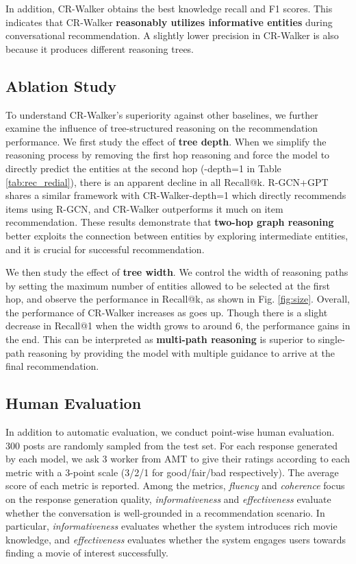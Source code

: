\documentclass[11pt]{article}
\begin{document}
In addition, CR-Walker obtains the best knowledge recall and F1 scores. This indicates that CR-Walker \textbf{reasonably utilizes informative entities} during conversational recommendation. A slightly lower precision in CR-Walker is also because it produces different reasoning trees. 



\subsection{Ablation Study}

To understand CR-Walker's superiority against other baselines, we further examine the influence of tree-structured reasoning on the recommendation performance. We first study the effect of \textbf{tree depth}. When we simplify the reasoning process by removing the first hop reasoning and force the model to directly predict the entities at the second hop (-depth=1 in Table \ref{tab:rec_redial}), there is an apparent decline in all Recall@k. R-GCN+GPT shares a similar framework with CR-Walker-depth=1 which directly recommends items using R-GCN, and CR-Walker outperforms it much on item recommendation. These results demonstrate that \textbf{two-hop graph reasoning} better exploits the connection between entities by exploring intermediate entities, and it is crucial for successful recommendation. 

We then study the effect of \textbf{tree width}. We control the width of reasoning paths by setting the maximum number of entities  allowed to be selected at the first hop, and observe the performance in Recall@k, as shown in Fig. \ref{fig:size}. Overall, the performance of CR-Walker increases as  goes up. Though there is a slight decrease in Recall@1 when the width grows to around 6, the performance gains in the end. 
This can be interpreted as \textbf{multi-path reasoning} is superior to single-path reasoning by providing the model with multiple guidance to arrive at the final recommendation.


\subsection{Human Evaluation}\label{sec:human}

In addition to automatic evaluation, we conduct point-wise human evaluation. 300 posts are randomly sampled from the test set. For each response generated by each model, we ask 3 worker from AMT to give their ratings according to each metric with a 3-point scale (3/2/1 for good/fair/bad respectively). The average score of each metric is reported. Among the metrics, \textit{fluency} and \textit{coherence} focus on the response generation quality, \textit{informativeness} and \textit{effectiveness} evaluate whether the conversation is well-grounded in a recommendation scenario. In particular, \textit{informativeness} evaluates whether the system introduces rich movie knowledge, and \textit{effectiveness} evaluates whether the system engages users towards finding a movie of interest successfully.
\end{document}
